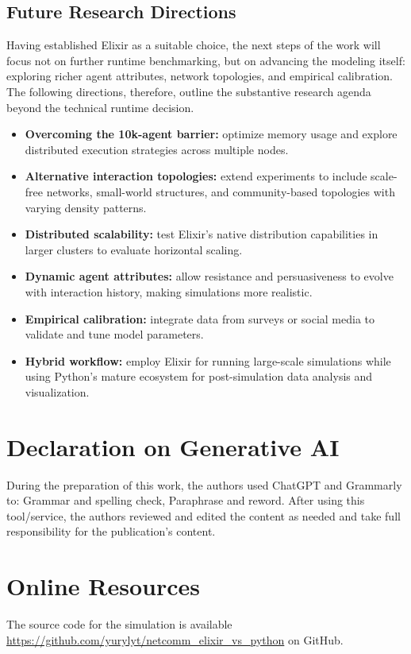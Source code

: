 \documentclass[
]{ceurart}
\begin{document}
\subsection{Future Research Directions}
Having established Elixir as a suitable choice, the next steps of the work will focus not on further runtime benchmarking, but on advancing the modeling itself: exploring richer agent attributes, network topologies, and empirical calibration. The following directions, therefore, outline the substantive research agenda beyond the technical runtime decision.
\begin{itemize}
	\item \textbf{Overcoming the 10k-agent barrier:} optimize memory usage and explore distributed execution strategies across multiple nodes.
	\item \textbf{Alternative interaction topologies:} extend experiments to include scale-free networks, small-world structures, and community-based topologies with varying density patterns.
	\item \textbf{Distributed scalability:} test Elixir's native distribution capabilities in larger clusters to evaluate horizontal scaling.
	\item \textbf{Dynamic agent attributes:} allow resistance and persuasiveness to evolve with interaction history, making simulations more realistic.
	\item \textbf{Empirical calibration:} integrate data from surveys or social media to validate and tune model parameters.
    \item \textbf{Hybrid workflow:} employ Elixir for running large-scale simulations while using Python's mature ecosystem for post-simulation data analysis and visualization.
\end{itemize}


\section*{Declaration on Generative AI}  
 During the preparation of this work, the authors used ChatGPT and Grammarly to: Grammar and spelling check, Paraphrase and reword. After using this tool/service, the authors reviewed and edited the content as needed and take full responsibility for the publication’s content.



\appendix

\section{Online Resources}
The source code for the simulation is available \url{https://github.com/yurylyt/netcomm_elixir_vs_python} on GitHub. 
\end{document}
